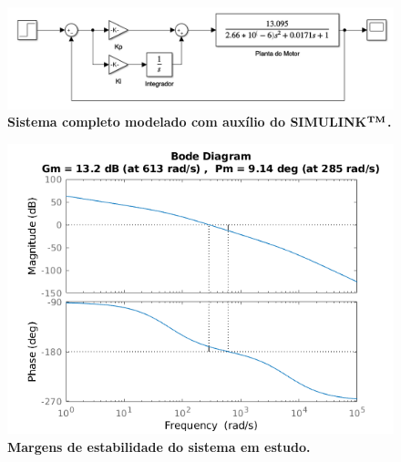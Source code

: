 \documentclass[10pt,fleqn,a4paper]{article}
\begin{document}
    \begin{figure}[ht]
    	\begin{center}
    		\includegraphics[angle=0, scale=0.4]{images/sistemaEControlador}
    	\end{center}
    	\caption{\textbf{Sistema completo modelado com auxílio do SIMULINK$^{\small{\textbf{TM}}}$.}}
    	\label{fig:sistemasimulink}
    \end{figure}

	\begin{figure}[ht]
		\begin{center}
			\includegraphics[angle=0, scale=0.8]{images/margins.png}
		\end{center}
		\caption{\textbf{Margens de estabilidade do sistema em estudo.}}
		\label{fig:margin}
	\end{figure}
\end{document}
